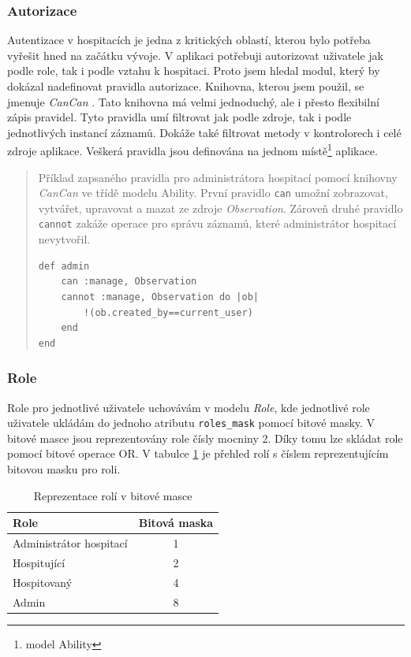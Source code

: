 \subsubsection{Autorizace}
Autentizace v hospitacích je jedna z kritických oblastí, kterou bylo potřeba vyřešit hned na začátku vývoje. V aplikaci potřebuji autorizovat uživatele jak podle role, tak i podle vztahu k hospitaci. Proto jsem hledal modul, který by dokázal nadefinovat pravidla autorizace. Knihovna, kterou jsem použil, se jmenuje \textit{CanCan} \cite{cancan} . Tato knihovna má velmi jednoduchý, ale i přesto flexibilní zápis pravidel. Tyto pravidla umí filtrovat jak podle zdroje, tak i podle jednotlivých instancí záznamů. Dokáže také filtrovat metody v kontrolorech i celé zdroje aplikace. Veškerá pravidla jsou definována na jednom místě\footnote{model Ability} aplikace.

\begin{quote}
Příklad zapsaného pravidla pro administrátora hospitací pomocí knihovny \textit{CanCan} ve třídě modelu Ability. První pravidlo \verb|can| umožní zobrazovat, vytvářet, upravovat a mazat ze zdroje \textit{Observation}. Zároveň druhé pravidlo \verb|cannot| zakáže operace pro správu záznamů, které administrátor hospitací nevytvořil.

\begin{verbatim}
def admin
    can :manage, Observation
    cannot :manage, Observation do |ob|
        !(ob.created_by==current_user)
    end
end
\end{verbatim} 
\end{quote}

\subsubsection{Role}
\label{sec:role}
Role pro jednotlivé uživatele uchovávám v modelu \textit{Role}, kde jednotlivé role uživatele ukládám do jednoho atributu \verb|roles_mask| pomocí bitové masky. V bitové masce jsou reprezentovány role čísly mocniny 2. Díky tomu lze skládat role pomocí bitové operace OR. V tabulce \ref{tab:role} je přehled rolí s číslem reprezentujícím bitovou masku pro roli.

\begin{table}[h]
\begin{center}
\begin{tabular}{|l|c|}

\hline
\textbf{Role} & \textbf{Bitová maska} \\ \hline
Administrátor hospitací & 1 \\
Hospitující & 2 \\ 
Hospitovaný & 4 \\
Admin & 8 \\\hline

\end{tabular}
\caption{Reprezentace rolí v bitové masce}
\label{tab:role}
\end{center}
\end{table}

